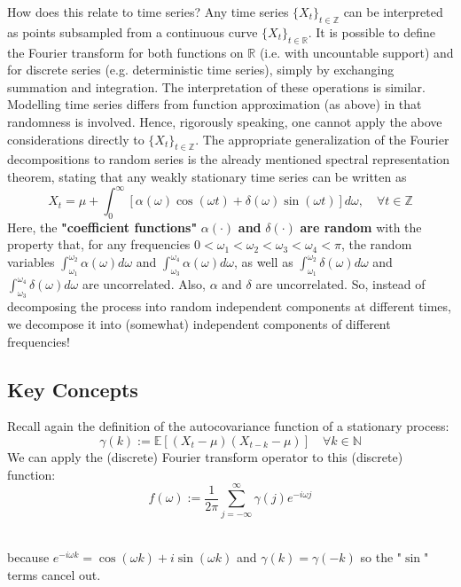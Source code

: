 How does this relate to time series? Any time series $\{X_t\}_{t\in \mathbb{Z}}$
 can be interpreted as points subsampled from a continuous curve $\{X_t\}_{t\in \mathbb{R}}$. It is possible to define the Fourier transform for both functions on $\mathbb{R}$ (i.e. with uncountable support) and for discrete series (e.g. deterministic time series), simply by exchanging summation and integration. The interpretation of these operations is similar.\\

 Modelling time series differs from function approximation (as above) in that randomness is involved. Hence, rigorously speaking, one cannot apply the above considerations directly to $\{X_t\}_{t\in \mathbb{Z}}$. The appropriate generalization of the Fourier decompositions to random series is the already mentioned spectral representation theorem, stating that any weakly stationary time series can be written as \[X_t=\mu+\int_0^\infty \left[\alpha(\omega) \cos(\omega t) + \delta(\omega) \sin(\omega t) \right] d\omega, \quad \forall t \in \mathbb{Z}\]
 Here, the \textbf{"coefficient functions"} $\alpha(\cdot)$ \textbf{and} $\delta(\cdot)$ \textbf{are random} with the property that, for any frequencies $0<\omega_1<\omega_2<\omega_3<\omega_4<\pi$, the random variables $\int_{\omega_1}^{\omega_2}\alpha(\omega) d \omega $ and $\int_{\omega_3}^{\omega_4}\alpha(\omega) d \omega $, as well as $\int_{\omega_1}^{\omega_2}\delta(\omega) d \omega $ and $\int_{\omega_3}^{\omega_4}\delta(\omega) d \omega $ are uncorrelated. Also, $\alpha$ and $\delta$ are uncorrelated. So, instead of decomposing the process into random independent components at different times, we decompose it into (somewhat) independent components of different frequencies!

\subsection{Key Concepts}
Recall again the definition of the autocovariance function of a stationary process: \[
\gamma(k):=\mathbb{E}[(X_t-\mu)(X_{t-k}-\mu)] \quad \forall k\in \mathbb{N}
\]
We can apply the (discrete) Fourier transform operator to this (discrete) function: \[
f(\omega):=\frac{1}{2\pi} \sum_{j=-\infty}^\infty \gamma(j) e^{-i\omega j}
\] \

because $e^{-i\omega k} = \cos(\omega k) + i \sin(\omega k)$ and $\gamma(k) = \gamma(-k)$ so the "$\sin$" terms cancel out. \\




